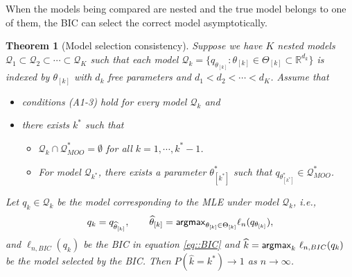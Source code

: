 \documentclass[aos, preprint]{imsart}
\theoremstyle{plain}
\newtheorem{theorem}{Theorem}[section]
\theoremstyle{definition}
\let\hat\widehat
\newcommand{\E}{\mbox{$\mathbb{E}$}}
\newcommand{\R}{\mbox{$\mathbb{R}$}}
\newcommand{\bX}{\mathbf{X}}
\newcommand{\bR}{\mathbf{R}}
\begin{document}
When the models being compared are nested and the true model belongs to one of them, the BIC 
can select the correct model asymptotically. 
\begin{theorem}[Model selection consistency]
Suppose we have $K$ nested models $\mathcal{Q}_1\subset \mathcal{Q}_2\subset \cdots\subset \mathcal{Q}_K$
such that each model $\mathcal{Q}_k = \{q_{\theta_{[k]}}: \theta_{[k]} \in \Theta_{[k]}\subset \R^{d_k}\}$ is indexed by  $\theta_{[k]}$
with $d_k$ free parameters and $d_1<d_2<\cdots<d_K$. 
Assume that 
\begin{itemize}
\item[(AS)]  conditions (A1-3) hold for every model $\mathcal{Q}_k$ and 
\item[] there exists $k^*$ such that
\begin{itemize}
\item[(B1)] $\mathcal{Q}_k\cap \mathcal{Q}^*_{MOO} =\emptyset$ for all $k=1,\cdots, k^*-1$.
\item[(B2)] For model $\mathcal{Q}_{k^*}$, there exists a parameter $\theta^*_{[k^*]}$ such that $q_{\theta^*_{[k^*]}}\in \mathcal{Q}^*_{MOO}$. 
\end{itemize}
\end{itemize}
Let $q_k \in \mathcal{Q}_k$ be the model corresponding to the MLE under model $\mathcal{Q}_k$,
i.e., 
$$
q_k  = q_{\hat \theta_{[k]}},\qquad \hat \theta_{[k]} = {\sf argmax}_{\theta_{[k]} \in \Theta_{[k]}} \ell_n(q_{\theta_{[k]}}),
$$
and
$\ell_{n, BIC}(q_k)$ be the BIC  in equation \eqref{eq::BIC}
and $\hat k = {\sf argmax}_k\,\, \ell_{n, BIC}(q_k)$ be the model selected by the BIC. 
Then 
$
P\left(\hat k = k^*\right) {\rightarrow}1
$
as $n\rightarrow \infty$.
\label{thm::BIC}
\end{theorem}
\end{document}
